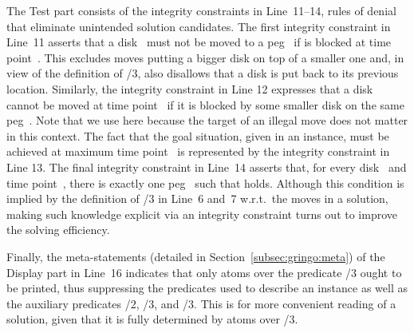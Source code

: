 The Test part consists of the integrity constraints in Line~11--14,
rules of denial that eliminate unintended solution candidates.
The first integrity constraint in Line~11 asserts 
that a disk~ must not be moved to a peg~
if  is blocked at time point~.
This excludes moves putting a bigger disk on top of a smaller one and,
in view of the definition of /$3$,
also disallows that a disk is put back to its previous location.
Similarly, the integrity constraint in Line 12 
expresses that a disk~ cannot be moved at time point~
if it is blocked by some smaller disk on the same peg~.
Note that we use  here because the
target of an illegal move does not matter in this context.
The fact that the goal situation, given in an instance,
must be achieved at maximum time point~
is represented by the integrity constraint in Line 13.
The final integrity constraint in Line~14
asserts that, for every disk~ and time point~, 
there is exactly one peg~ such that
 holds.
Although this condition is implied by the definition of /$3$ in Line~6 and~7
w.r.t.\ the moves in a solution,
making such knowledge explicit via an integrity constraint
turns out to improve the solving efficiency.

Finally, the meta-statements (detailed in Section~\ref{subsec:gringo:meta})
of the Display part in Line~16
indicates that only atoms over the predicate /$3$ ought to be printed,
thus suppressing the predicates used to describe an instance as well as
the auxiliary predicates /$2$, /$3$, and /$3$.
This is for more convenient reading of a solution,
given that it is fully determined by atoms over /$3$.


